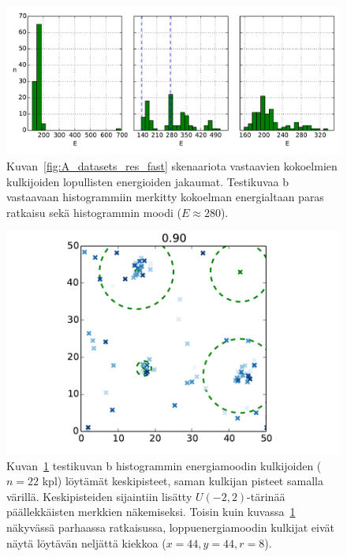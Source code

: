 \begin{figure}[htpb]
    \centering
    \includegraphics[width=1.0\linewidth]{figures/A_final_histo3_fast.pdf}
    \caption{Kuvan~\ref{fig:A_datasets_res_fast} skenaariota vastaavien kokoelmien kulkijoiden lopullisten energioiden jakaumat.
        Testikuvaa b vastaavaan histogrammiin merkitty kokoelman energialtaan paras ratkaisu sekä histogrammin moodi ($E \approx 280$).
        \label{fig:A_final_histo3_fast}
    }
\end{figure}


\begin{figure}[htpb]
    \centering
    \includegraphics[width=1.0\linewidth]{figures/A_modalbin_cc_fast_1.pdf}
    \caption{Kuvan~\ref{fig:A_final_histo3_fast} testikuvan b histogrammin energiamoodin kulkijoiden ($n = 22$ kpl) löytämät keskipisteet, saman kulkijan pisteet samalla värillä.
        Keskipisteiden sijaintiin lisätty $U(-2,2)$-tärinää päällekkäisten merkkien näkemiseksi.
        Toisin kuin kuvassa~\ref{fig:A_final_histo3_fast} näkyvässä parhaassa ratkaisussa, loppuenergiamoodin kulkijat eivät näytä löytävän neljättä kiekkoa ($x = 44, y = 44, r = 8$).
        \label{fig:A_modalbin_cc_fast_1}
    }
\end{figure}

